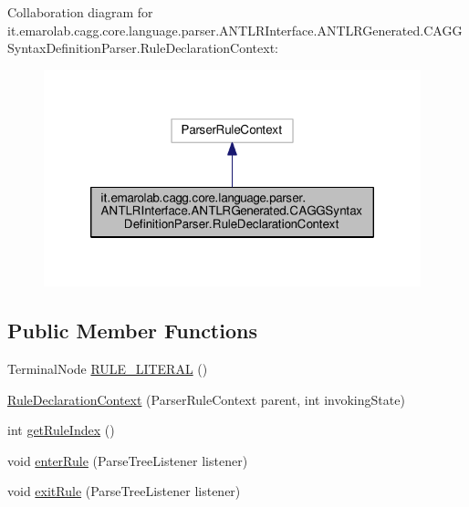 Collaboration diagram for it.\-emarolab.\-cagg.\-core.\-language.\-parser.\-A\-N\-T\-L\-R\-Interface.\-A\-N\-T\-L\-R\-Generated.\-C\-A\-G\-G\-Syntax\-Definition\-Parser.\-Rule\-Declaration\-Context\-:
\nopagebreak
\begin{figure}[H]
\begin{center}
\leavevmode
\includegraphics[width=310pt]{classit_1_1emarolab_1_1cagg_1_1core_1_1language_1_1parser_1_1ANTLRInterface_1_1ANTLRGenerated_1_e9d637d06b631ed6c6847ec70510d0c9}
\end{center}
\end{figure}
\subsection*{Public Member Functions}
\begin{DoxyCompactItemize}
\item 
Terminal\-Node \hyperlink{classit_1_1emarolab_1_1cagg_1_1core_1_1language_1_1parser_1_1ANTLRInterface_1_1ANTLRGenerated_1_632d39d35185b34ff726726c3c8fa6b6_a2f71884891e03a19eabcda37d3c24663}{R\-U\-L\-E\-\_\-\-L\-I\-T\-E\-R\-A\-L} ()
\item 
\hyperlink{classit_1_1emarolab_1_1cagg_1_1core_1_1language_1_1parser_1_1ANTLRInterface_1_1ANTLRGenerated_1_632d39d35185b34ff726726c3c8fa6b6_abe738e8495eb7129cb7cfa96e707ce9c}{Rule\-Declaration\-Context} (Parser\-Rule\-Context parent, int invoking\-State)
\item 
int \hyperlink{classit_1_1emarolab_1_1cagg_1_1core_1_1language_1_1parser_1_1ANTLRInterface_1_1ANTLRGenerated_1_632d39d35185b34ff726726c3c8fa6b6_a2791e0abc528331aeec65027eab52625}{get\-Rule\-Index} ()
\item 
void \hyperlink{classit_1_1emarolab_1_1cagg_1_1core_1_1language_1_1parser_1_1ANTLRInterface_1_1ANTLRGenerated_1_632d39d35185b34ff726726c3c8fa6b6_af693f5ae58755ae68068760d8db8987c}{enter\-Rule} (Parse\-Tree\-Listener listener)
\item 
void \hyperlink{classit_1_1emarolab_1_1cagg_1_1core_1_1language_1_1parser_1_1ANTLRInterface_1_1ANTLRGenerated_1_632d39d35185b34ff726726c3c8fa6b6_a61ce568003ea9356f65dce2e2ba32230}{exit\-Rule} (Parse\-Tree\-Listener listener)
\end{DoxyCompactItemize}


